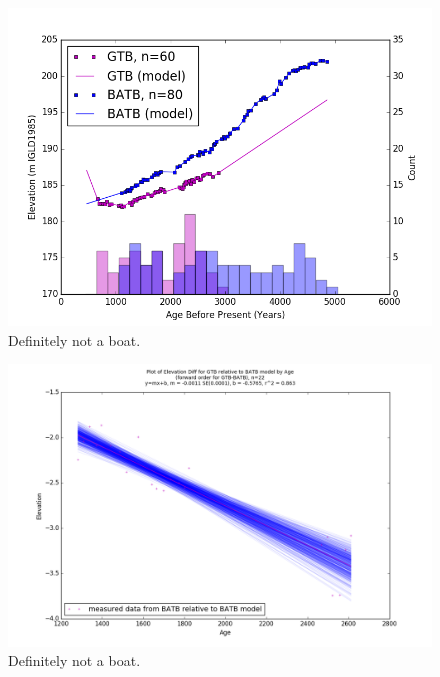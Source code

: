 \documentclass{article}
\begin{document}
\begin{figure}[h]
	\includegraphics[width=\linewidth]{data/GTB-BATB_DataAndModel.png}
	\caption{Definitely not a boat.}
	\label{fig:data_GTBxBATB}
\end{figure}
\newpage

\begin{figure}[h]
	\includegraphics[width=\linewidth]{data/gias/theGIA_GTB_relative_to_BATB.png}
	\caption{Definitely not a boat.}
	\label{fig:gias_GTBxBATB}
\end{figure}
\newpage
\end{document}
